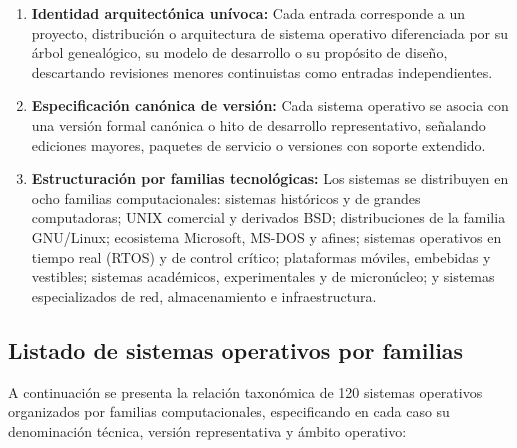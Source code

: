 \documentclass[12pt]{article}
\begin{document}
\begin{enumerate}[leftmargin=*]
    \item \textbf{Identidad arquitectónica unívoca:} Cada entrada corresponde a un proyecto, distribución o arquitectura de sistema operativo diferenciada por su árbol genealógico, su modelo de desarrollo o su propósito de diseño, descartando revisiones menores continuistas como entradas independientes.
    \item \textbf{Especificación canónica de versión:} Cada sistema operativo se asocia con una versión formal canónica o hito de desarrollo representativo, señalando ediciones mayores, paquetes de servicio o versiones con soporte extendido.
    \item \textbf{Estructuración por familias tecnológicas:} Los sistemas se distribuyen en ocho familias computacionales: sistemas históricos y de grandes computadoras; UNIX comercial y derivados BSD; distribuciones de la familia GNU/Linux; ecosistema Microsoft, MS-DOS y afines; sistemas operativos en tiempo real (RTOS) y de control crítico; plataformas móviles, embebidas y vestibles; sistemas académicos, experimentales y de micronúcleo; y sistemas especializados de red, almacenamiento e infraestructura.
\end{enumerate}

\subsection{Listado de sistemas operativos por familias}\label{sec:listadoFamilias}

A continuación se presenta la relación taxonómica de 120 sistemas operativos organizados por familias computacionales, especificando en cada caso su denominación técnica, versión representativa y ámbito operativo:
\end{document}
